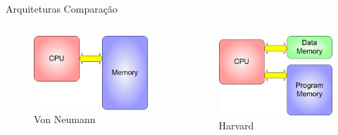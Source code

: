 \documentclass[t]{beamer}
\begin{document}
\begin{frame}{Arquiteturas}
Comparação
\begin{columns}
\begin{column}{0.5\linewidth}
\begin{figure}
\includegraphics[width=\linewidth]{learn_arduino_Von_Neumann}
\caption{Von Neumann}
\end{figure}
\end{column}
\begin{column}{0.5\linewidth}
\begin{figure}
\includegraphics[width=\linewidth]{learn_arduino_Harvard}
\caption{Harvard}
\end{figure}
\end{column}
\end{columns}
\end{frame}
\end{document}
